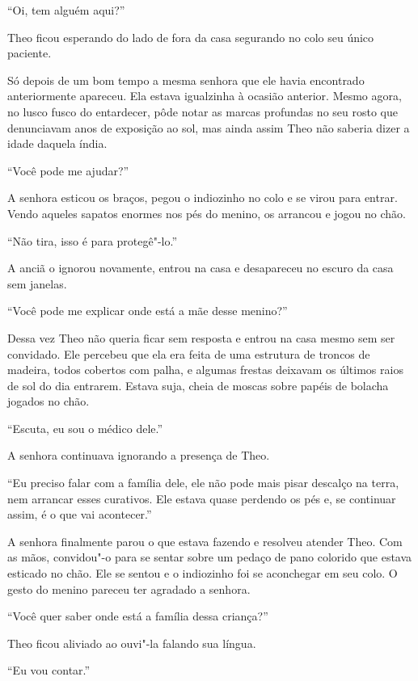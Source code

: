 \asterisc


``Oi, tem alguém aqui?''

Theo ficou esperando do lado de fora da casa segurando no colo seu único
paciente.

Só depois de um bom tempo a mesma senhora que ele havia encontrado
anteriormente apareceu. Ela estava igualzinha à ocasião anterior. Mesmo
agora, no lusco fusco do entardecer, pôde notar as marcas profundas no
seu rosto que denunciavam anos de exposição ao sol, mas ainda assim Theo
não saberia dizer a idade daquela índia.

``Você pode me ajudar?''

A senhora esticou os braços, pegou o indiozinho no colo e se virou para
entrar. Vendo aqueles sapatos enormes nos pés do menino, os arrancou e
jogou no chão.

``Não tira, isso é para protegê"-lo.''

A anciã o ignorou novamente, entrou na casa e desapareceu no escuro da
casa sem janelas.

``Você pode me explicar onde está a mãe desse menino?''

Dessa vez Theo não queria ficar sem resposta e entrou na casa mesmo sem
ser convidado. Ele percebeu que ela era feita de uma estrutura de
troncos de madeira, todos cobertos com palha, e algumas frestas deixavam
os últimos raios de sol do dia entrarem. Estava suja, cheia de moscas
sobre papéis de bolacha jogados no chão.

``Escuta, eu sou o médico dele.''

A senhora continuava ignorando a presença de Theo.

``Eu preciso falar com a família dele, ele não pode mais pisar descalço
na terra, nem arrancar esses curativos. Ele estava quase perdendo os pés
e, se continuar assim, é o que vai acontecer.''

A senhora finalmente parou o que estava fazendo e resolveu atender Theo.
Com as mãos, convidou"-o para se sentar sobre um pedaço de pano colorido
que estava esticado no chão. Ele se sentou e o indiozinho foi se
aconchegar em seu colo. O gesto do menino pareceu ter agradado a
senhora.

``Você quer saber onde está a família dessa criança?''

Theo ficou aliviado ao ouvi"-la falando sua língua.

``Eu vou contar.''

